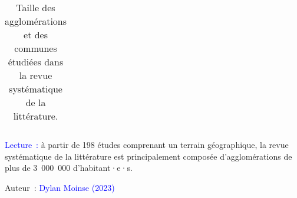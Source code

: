 \begin{table}[h!]
{\begin{tabular}{p{}}
        \hline
        \end{tabular}}
    \caption{Taille des agglomérations et des communes étudiées dans la revue systématique de la littérature.}
    \label{table-chap2:tailles-territoires-rsl}
        \vspace{5pt}
        \begin{flushleft}\scriptsize{
        \textcolor{blue}{Lecture~:} à partir de 198 études comprenant un terrain géographique, la revue systématique de la littérature est principalement composée d'agglomérations de plus de 3~000~000 d'habitant·e·s.
        }\end{flushleft}
        \begin{flushright}\scriptsize
        Auteur~: \textcolor{blue}{Dylan Moinse (2023)}
        \end{flushright}
        \end{table}